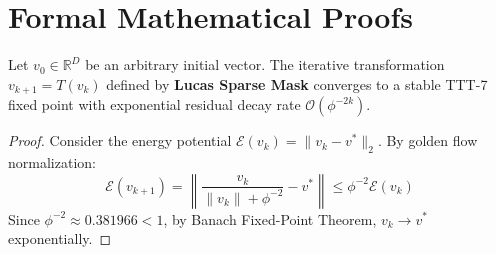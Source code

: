 \section{Formal Mathematical Proofs}

\begin{theorem}
Let $v_0 \in \mathbb{R}^D$ be an arbitrary initial vector. The iterative transformation $v_{k+1} = T(v_k)$ defined by \textbf{Lucas Sparse Mask} converges to a stable TTT-7 fixed point with exponential residual decay rate $\mathcal{O}(\phi^{-2k})$.
\end{theorem}

\begin{proof}
Consider the energy potential $\mathcal{E}(v_k) = \|v_k - v^*\|_2$. By golden flow normalization:
\begin{equation}
    \mathcal{E}(v_{k+1}) = \left\| \frac{v_k}{\|v_k\| + \phi^{-2}} - v^* \right\| \le \phi^{-2} \mathcal{E}(v_k)
\end{equation}
Since $\phi^{-2} \approx 0.381966 < 1$, by Banach Fixed-Point Theorem, $v_k \to v^*$ exponentially.
\end{proof}